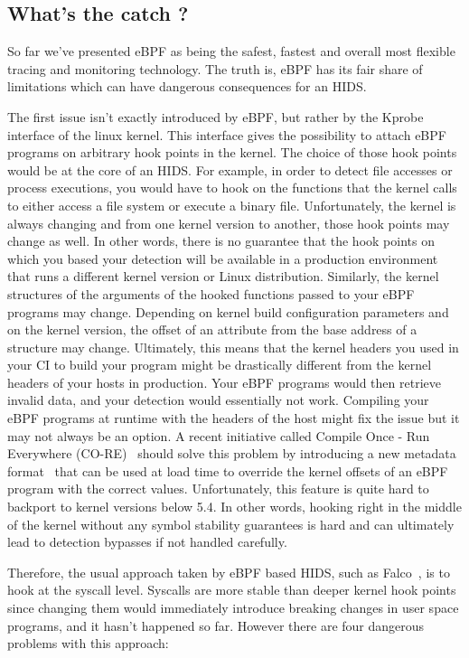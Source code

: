 \subsection{What's the catch ?}

So far we’ve presented eBPF as being the safest, fastest and overall most flexible tracing and monitoring technology.
The truth is, eBPF has its fair share of limitations which can have dangerous consequences for an HIDS.

The first issue isn't exactly introduced by eBPF, but rather by the Kprobe interface of the linux kernel.
This interface gives the possibility to attach eBPF programs on arbitrary hook points in the kernel.
The choice of those hook points would be at the core of an HIDS.
For example, in order to detect file accesses or process executions, you would have to hook on the functions that the kernel calls to either access a file system or execute a binary file.
Unfortunately, the kernel is always changing and from one kernel version to another, those hook points may change as well.
In other words, there is no guarantee that the hook points on which you based your detection will be available in a production environment that runs a different kernel version or Linux distribution.
Similarly, the kernel structures of the arguments of the hooked functions passed to your eBPF programs may change.
Depending on kernel build configuration parameters and on the kernel version, the offset of an attribute from the base address of a structure may change.
Ultimately, this means that the kernel headers you used in your CI to build your program might be drastically different from the kernel headers of your hosts in production.
Your eBPF programs would then retrieve invalid data, and your detection would essentially not work.
Compiling your eBPF programs at runtime with the headers of the host might fix the issue but it may not always be an option.
A recent initiative called Compile Once - Run Everywhere (CO-RE)~\cite{RuntimeSecurityMonitoringWithEBPF:CORE} should solve this problem by introducing a new metadata format~\cite{RuntimeSecurityMonitoringWithEBPF:BTF} that can be used at load time to override the kernel offsets of an eBPF program with the correct values.
Unfortunately, this feature is quite hard to backport to kernel versions below 5.4.
In other words, hooking right in the middle of the kernel without any symbol stability guarantees is hard and can ultimately lead to detection bypasses if not handled carefully.

Therefore, the usual approach taken by eBPF based HIDS, such as Falco~\cite{RuntimeSecurityMonitoringWithEBPF:Falco}, is to hook at the syscall level.
Syscalls are more stable than deeper kernel hook points since changing them would immediately introduce breaking changes in user space programs, and it hasn’t happened so far.
However there are four dangerous problems with this approach:

